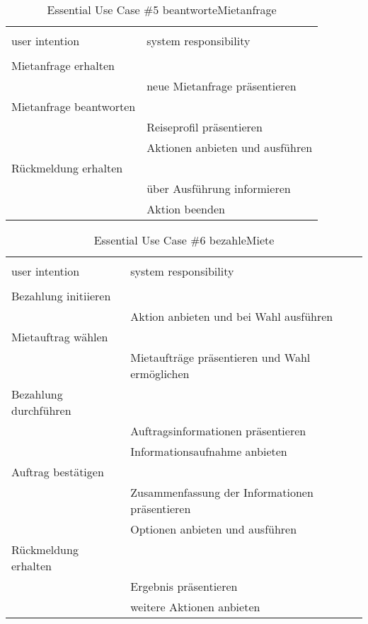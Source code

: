 \begin{table}[H]
\caption{Essential Use Case \#5 beantworteMietanfrage }
\centering
\begin{tabular}{l l}
\\ [-0.5ex]

\hline\hline
\\ [-0.5ex]
user intention & system responsibility
\\ [1.5ex]
\hline
\\ [-0.5ex]
Mietanfrage erhalten 		& 											 \\[1ex]
							& neue Mietanfrage präsentieren				 \\[1ex]
Mietanfrage beantworten  	& 											 \\[1ex] 
							& Reiseprofil präsentieren					 \\[1ex]
							& Aktionen anbieten und ausführen			 \\[1ex]
Rückmeldung erhalten		& 											 \\[1ex]
							& über Ausführung informieren				 \\[1ex]
							& Aktion beenden							 \\[1ex]

\hline
\end{tabular}
\label{tab:mietanfrage}
\end{table}


\begin{table}[H]
\caption{Essential Use Case \#6 bezahleMiete }
\centering
\begin{tabular}{l l}
\\ [-0.5ex]

\hline\hline
\\ [-0.5ex]
user intention & system responsibility
\\ [1.5ex]
\hline
\\ [-0.5ex]
Bezahlung initiieren	 	& 											 \\[1ex]
							& Aktion anbieten und bei Wahl ausführen	 \\[1ex]
Mietauftrag wählen		  	& 											 \\[1ex] 
							& Mietaufträge präsentieren und Wahl ermöglichen \\[1ex]
Bezahlung durchführen		& 											 \\[1ex]
							& Auftragsinformationen präsentieren		 \\[1ex]
							& Informationsaufnahme anbieten	     		 \\[1ex]
Auftrag bestätigen			&	     									 \\[1ex]
							& Zusammenfassung der Informationen präsentieren \\[1ex]
							& Optionen anbieten	und ausführen			 \\[1ex]
Rückmeldung erhalten		& 		    		                         \\[1ex]
							& Ergebnis präsentieren		    		     \\[1ex]
							& weitere Aktionen anbieten	    		     \\[1ex]


\hline
\end{tabular}
\label{tab:bezahlung}
\end{table}

